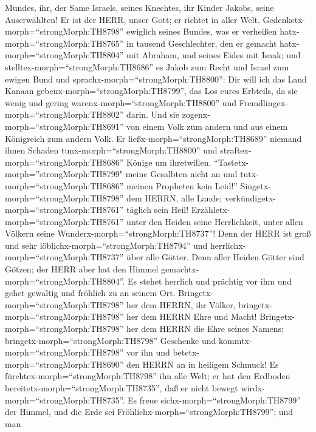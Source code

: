 Mundes,  ihr, der Same Israels, seines Knechtes, ihr Kinder
Jakobs, seine Auserwählten!  Er ist der HERR, unser Gott;
er richtet in aller Welt. 
Gedenketx-morph=``strongMorph:TH8798'' ewiglich seines Bundes, was er
verheißen hatx-morph=``strongMorph:TH8765'' in tausend Geschlechter,
 den er gemacht hatx-morph=``strongMorph:TH8804'' mit
Abraham, und seines Eides mit Isaak;  und
stelltex-morph=``strongMorph:TH8686'' es Jakob zum Recht und Israel zum
ewigen Bund  und sprachx-morph=``strongMorph:TH8800'': Dir
will ich das Land Kanaan gebenx-morph=``strongMorph:TH8799'', das Los
eures Erbteils,  da sie wenig und gering
warenx-morph=``strongMorph:TH8800'' und
Fremdlingex-morph=``strongMorph:TH8802'' darin.  Und sie
zogenx-morph=``strongMorph:TH8691'' von einem Volk zum andern und aus
einem Königreich zum andern Volk.  Er
ließx-morph=``strongMorph:TH8689'' niemand ihnen Schaden
tunx-morph=``strongMorph:TH8800'' und
straftex-morph=``strongMorph:TH8686'' Könige um ihretwillen.
 ``Tastetx-morph=''strongMorph:TH8799" meine Gesalbten
nicht an und tutx-morph=``strongMorph:TH8686'' meinen Propheten kein
Leid!''  Singetx-morph=``strongMorph:TH8798'' dem HERRN,
alle Lande; verkündigetx-morph=``strongMorph:TH8761'' täglich sein Heil!
 Erzähletx-morph=``strongMorph:TH8761'' unter den Heiden
seine Herrlichkeit, unter allen Völkern seine
Wunderx-morph=``strongMorph:TH8737''!  Denn der HERR ist
groß und sehr löblichx-morph=``strongMorph:TH8794'' und
herrlichx-morph=``strongMorph:TH8737'' über alle Götter. 
Denn aller Heiden Götter sind Götzen; der HERR aber hat den Himmel
gemachtx-morph=``strongMorph:TH8804''.  Es stehet herrlich
und prächtig vor ihm und gehet gewaltig und fröhlich zu an seinem Ort.
 Bringetx-morph=``strongMorph:TH8798'' her dem HERRN, ihr
Völker, bringetx-morph=``strongMorph:TH8798'' her dem HERRN Ehre und
Macht!  Bringetx-morph=``strongMorph:TH8798'' her dem HERRN
die Ehre seines Namens; bringetx-morph=``strongMorph:TH8798'' Geschenke
und kommtx-morph=``strongMorph:TH8798'' vor ihn und
betetx-morph=``strongMorph:TH8690'' den HERRN an in heiligem Schmuck!
 Es fürchtex-morph=``strongMorph:TH8798'' ihn alle Welt; er
hat den Erdboden bereitetx-morph=``strongMorph:TH8735'', daß er nicht
bewegt wirdx-morph=``strongMorph:TH8735''.  Es freue
sichx-morph=``strongMorph:TH8799'' der Himmel, und die Erde sei
Fröhlichx-morph=``strongMorph:TH8799''; und man
